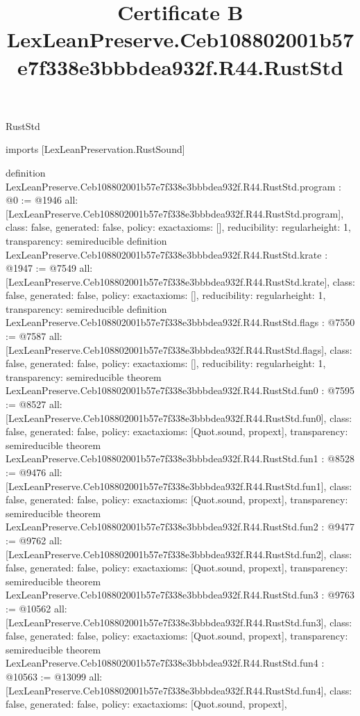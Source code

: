 \begin{lexlean}{RustStd}
\title{Certificate B LexLeanPreserve.Ceb108802001b57e7f338e3bbbdea932f.R44.RustStd}
\begin{coremodule}
imports [LexLeanPreservation.RustSound]

definition LexLeanPreserve.Ceb108802001b57e7f338e3bbbdea932f.R44.RustStd.program : @0 := @1946 {
  all: [LexLeanPreserve.Ceb108802001b57e7f338e3bbbdea932f.R44.RustStd.program],
  class: false,
  generated: false,
  policy: exact{axioms: []},
  reducibility: regular{height: 1},
  transparency: semireducible
}
definition LexLeanPreserve.Ceb108802001b57e7f338e3bbbdea932f.R44.RustStd.krate : @1947 := @7549 {
  all: [LexLeanPreserve.Ceb108802001b57e7f338e3bbbdea932f.R44.RustStd.krate],
  class: false,
  generated: false,
  policy: exact{axioms: []},
  reducibility: regular{height: 1},
  transparency: semireducible
}
definition LexLeanPreserve.Ceb108802001b57e7f338e3bbbdea932f.R44.RustStd.flags : @7550 := @7587 {
  all: [LexLeanPreserve.Ceb108802001b57e7f338e3bbbdea932f.R44.RustStd.flags],
  class: false,
  generated: false,
  policy: exact{axioms: []},
  reducibility: regular{height: 1},
  transparency: semireducible
}
theorem LexLeanPreserve.Ceb108802001b57e7f338e3bbbdea932f.R44.RustStd.fun0 : @7595 := @8527 {
  all: [LexLeanPreserve.Ceb108802001b57e7f338e3bbbdea932f.R44.RustStd.fun0],
  class: false,
  generated: false,
  policy: exact{axioms: [Quot.sound, propext]},
  transparency: semireducible
}
theorem LexLeanPreserve.Ceb108802001b57e7f338e3bbbdea932f.R44.RustStd.fun1 : @8528 := @9476 {
  all: [LexLeanPreserve.Ceb108802001b57e7f338e3bbbdea932f.R44.RustStd.fun1],
  class: false,
  generated: false,
  policy: exact{axioms: [Quot.sound, propext]},
  transparency: semireducible
}
theorem LexLeanPreserve.Ceb108802001b57e7f338e3bbbdea932f.R44.RustStd.fun2 : @9477 := @9762 {
  all: [LexLeanPreserve.Ceb108802001b57e7f338e3bbbdea932f.R44.RustStd.fun2],
  class: false,
  generated: false,
  policy: exact{axioms: [Quot.sound, propext]},
  transparency: semireducible
}
theorem LexLeanPreserve.Ceb108802001b57e7f338e3bbbdea932f.R44.RustStd.fun3 : @9763 := @10562 {
  all: [LexLeanPreserve.Ceb108802001b57e7f338e3bbbdea932f.R44.RustStd.fun3],
  class: false,
  generated: false,
  policy: exact{axioms: [Quot.sound, propext]},
  transparency: semireducible
}
theorem LexLeanPreserve.Ceb108802001b57e7f338e3bbbdea932f.R44.RustStd.fun4 : @10563 := @13099 {
  all: [LexLeanPreserve.Ceb108802001b57e7f338e3bbbdea932f.R44.RustStd.fun4],
  class: false,
  generated: false,
  policy: exact{axioms: [Quot.sound, propext]},
}
\end{coremodule}
\end{lexlean}
